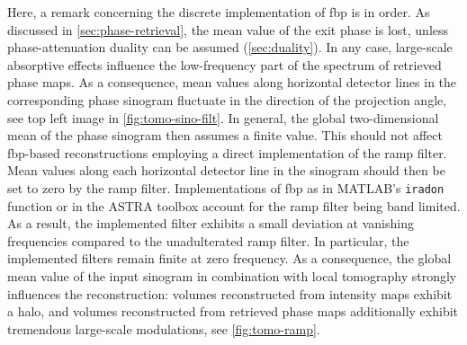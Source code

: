 \documentclass[
twoside,
openright,
titlepage,
numbers=noenddot,
headinclude,
fleqn,
a4paper,
footinclude=true,
cleardoublepage=empty,
abstractoff,
BCOR=5mm,
paper=a4,
fontsize=11pt,
british,ngerman,american,
]{scrreprt}
\begin{document}
Here, a remark concerning the discrete implementation of \ac{fbp} is
in order.  As discussed in \cref{sec:phase-retrieval}, the mean value
of the exit phase is lost, unless phase-attenuation duality can be
assumed (\cref{sec:duality}).  In any case, large-scale absorptive
effects influence the low-frequency part of the spectrum of retrieved
phase maps.  As a consequence, mean values along horizontal detector
lines in the corresponding phase sinogram fluctuate in the direction
of the projection angle, see top left image in
\cref{fig:tomo-sino-filt}.  In general, the global two-dimensional
mean of the phase sinogram then assumes a finite value.  This should
not affect \ac{fbp}-based reconstructions employing a direct
implementation of the ramp filter.  Mean values along each horizontal
detector line in the sinogram should then be set to zero by the ramp
filter.  Implementations of \ac{fbp} as in MATLAB's \texttt{iradon}
\cite{Matlab} function or in the ASTRA toolbox \cite{Palenstijn2011}
account for the ramp filter being band limited.  As a result, the
implemented filter exhibits a small deviation at vanishing frequencies
compared to the unadulterated ramp filter.  In particular, the
implemented filters remain finite at zero frequency.  As a
consequence, the global mean value of the input sinogram in
combination with local tomography strongly influences the
reconstruction: volumes reconstructed from intensity maps exhibit a
halo, and volumes reconstructed from retrieved phase maps additionally
exhibit tremendous large-scale modulations, see \cref{fig:tomo-ramp}.
\end{document}

